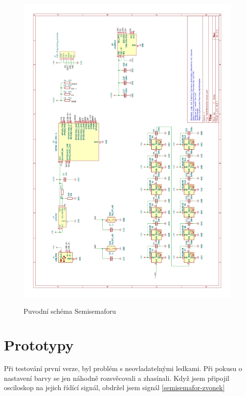 \begin{figure}[!h]
  \vspace{-20mm}
  \hspace{-10mm}
  \hspace{-10mm}
  \begin{minipage}{1.0\textwidth}
    \includegraphics[width=1.2\textwidth]{text/PraktickaCast/img/SemiSemafor-SCH-V1.png}
    \label{semisemafor-sch-v1}
    \caption{Puvodní schéma Semisemaforu}
  \end{minipage}
\end{figure}

\clearpage
\newpage
\newpage


\section{Prototypy}

Při testování první verze, byl problém s neovladatelnými ledkami.
Při pokusu o nastavení barvy se jen náhodně rozsvěcovali a zhasínali.
Když jsem připojil osciloskop na jejich řídící signál, obdržel jsem signál \ref{semisemafor-zvonek} %

